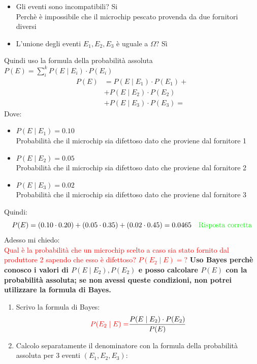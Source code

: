 \documentclass{article}  %
\theoremstyle{definition}
\begin{document}
\begin{esercizio}[Esercizio 2]
\begin{itemize}
\begin{itemize}
			      \item $P(E_3)=0.45$
		      \end{itemize}
		\item Gli eventi sono incompatibili? Si \\
		      Perchè è impossibile che il microchip pescato provenda da due fornitori diversi
		\item L'unione degli eventi $E_1,E_2,E_3$ è uguale a $\Omega$? Sì \\
	\end{itemize}
	Quindi uso la formula della probabilità assoluta $P(E) = \sum_{i}^{k} P(E \mid E_i) \cdot P(E_i)$
	\begin{align*}
		P(E)
		 & = P(E \mid E_1) \cdot P(E_1) + \\
		 & + P(E \mid E_2) \cdot P(E_2)   \\
		 & + P(E \mid E_3) \cdot P(E_3) =
	\end{align*}
	Dove:
	\begin{itemize}
		\item $P(E \mid E_1)=0.10$ \\
		      Probabilità che il microchip sia difettoso dato che proviene dal fornitore 1
		\item $P(E \mid E_2)=0.05$ \\
		      Probabilità che il microchip sia difettoso dato che proviene dal fornitore 2
		\item $P(E \mid E_3)=0.02$ \\
		      Probabilità che il microchip sia difettoso dato che proviene dal fornitore 3
	\end{itemize}
	Quindi:
	\[
		P(E)=(0.10 \cdot 0.20)+(0.05 \cdot 0.35)+(0.02 \cdot 0.45)=0.0465 \quad \textcolor{green}{\text{Risposta corretta}}
	\]
	Adesso mi chiedo: \\
	\textcolor{red}{Qual è la probabilità che un microchip scelto a caso sia stato fornito dal produttore 2 sapendo che esso è difettoso? $P(E_2 \mid E)=?$}
	\textbf{Uso Bayes perchè conosco i valori di $P(E \mid E_2), P(E_2)$ e posso calcolare $P(E)$ con la probabilità assoluta; se non avessi queste condizioni, non potrei
		utilizzare la formula di Bayes.}
	\begin{enumerate}
		\item Scrivo la formula di Bayes:
		      \[
			      \textcolor{red}{P(E_2 \mid E)=}\frac{P(E \mid E_2) \cdot P(E_2)}{P(E)}
		      \]
		\item Calcolo separatamente il denominatore con la formula della probabilità assoluta per 3 eventi $(E_1,E_2,E_3)$:

\end{enumerate}
\end{esercizio}
\end{document}
